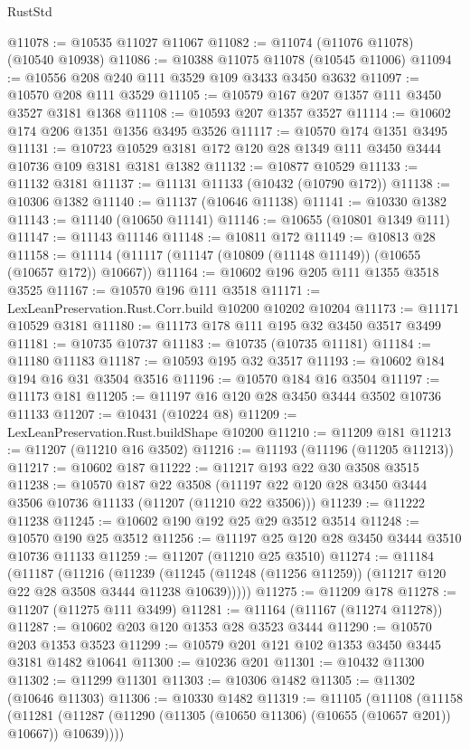 \begin{lexlean}{RustStd}
\begin{coremodule}
@11078 := @10535 @11027 @11067
@11082 := @11074 (@11076 @11078) (@10540 @10938)
@11086 := @10388 @11075 @11078 (@10545 @11006)
@11094 := @10556 @208 @240 @111 @3529 @109 @3433 @3450 @3632
@11097 := @10570 @208 @111 @3529
@11105 := @10579 @167 @207 @1357 @111 @3450 @3527 @3181 @1368
@11108 := @10593 @207 @1357 @3527
@11114 := @10602 @174 @206 @1351 @1356 @3495 @3526
@11117 := @10570 @174 @1351 @3495
@11131 := @10723 @10529 @3181 @172 @120 @28 @1349 @111 @3450 @3444 @10736 @109 @3181 @3181 @1382
@11132 := @10877 @10529
@11133 := @11132 @3181
@11137 := @11131 @11133 (@10432 (@10790 @172))
@11138 := @10306 @1382
@11140 := @11137 (@10646 @11138)
@11141 := @10330 @1382
@11143 := @11140 (@10650 @11141)
@11146 := @10655 (@10801 @1349 @111)
@11147 := @11143 @11146
@11148 := @10811 @172
@11149 := @10813 @28
@11158 := @11114 (@11117 (@11147 (@10809 (@11148 @11149)) (@10655 (@10657 @172)) @10667))
@11164 := @10602 @196 @205 @111 @1355 @3518 @3525
@11167 := @10570 @196 @111 @3518
@11171 := LexLeanPreservation.Rust.Corr.build @10200 @10202 @10204
@11173 := @11171 @10529 @3181
@11180 := @11173 @178 @111 @195 @32 @3450 @3517 @3499
@11181 := @10735 @10737
@11183 := @10735 (@10735 @11181)
@11184 := @11180 @11183
@11187 := @10593 @195 @32 @3517
@11193 := @10602 @184 @194 @16 @31 @3504 @3516
@11196 := @10570 @184 @16 @3504
@11197 := @11173 @181
@11205 := @11197 @16 @120 @28 @3450 @3444 @3502 @10736 @11133
@11207 := @10431 (@10224 @8)
@11209 := LexLeanPreservation.Rust.buildShape @10200
@11210 := @11209 @181
@11213 := @11207 (@11210 @16 @3502)
@11216 := @11193 (@11196 (@11205 @11213))
@11217 := @10602 @187
@11222 := @11217 @193 @22 @30 @3508 @3515
@11238 := @10570
    @187
    @22
    @3508
    (@11197 @22 @120 @28 @3450 @3444 @3506 @10736 @11133 (@11207 (@11210 @22 @3506)))
@11239 := @11222 @11238
@11245 := @10602 @190 @192 @25 @29 @3512 @3514
@11248 := @10570 @190 @25 @3512
@11256 := @11197 @25 @120 @28 @3450 @3444 @3510 @10736 @11133
@11259 := @11207 (@11210 @25 @3510)
@11274 := @11184
    (@11187
      (@11216
        (@11239 (@11245 (@11248 (@11256 @11259)) (@11217 @120 @22 @28 @3508 @3444 @11238 @10639)))))
@11275 := @11209 @178
@11278 := @11207 (@11275 @111 @3499)
@11281 := @11164 (@11167 (@11274 @11278))
@11287 := @10602 @203 @120 @1353 @28 @3523 @3444
@11290 := @10570 @203 @1353 @3523
@11299 := @10579 @201 @121 @102 @1353 @3450 @3445 @3181 @1482 @10641
@11300 := @10236 @201
@11301 := @10432 @11300
@11302 := @11299 @11301
@11303 := @10306 @1482
@11305 := @11302 (@10646 @11303)
@11306 := @10330 @1482
@11319 := @11105
    (@11108
      (@11158
        (@11281 (@11287 (@11290 (@11305 (@10650 @11306) (@10655 (@10657 @201)) @10667)) @10639))))

\end{coremodule}
\end{lexlean}
